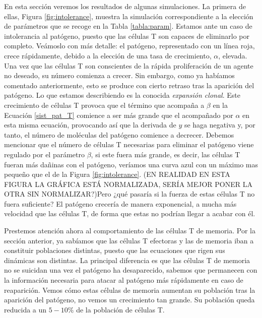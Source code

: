 En esta sección  veremos los resultados de algunas simulaciones. La primera de ellas, Figura \ref{fig:intolerance}, muestra la simulación correspondiente a la elección de parámetros que se recoge en la Tabla \ref{tabla:param}. Estamos ante un caso de intolerancia al patógeno, puesto que las células T son capaces de eliminarlo por completo. 
Veámoslo con más detalle: el patógeno, representado con un línea roja, crece rápidamente, debido a la elección de una tasa de crecimiento, $\alpha$, elevada. Una vez que las células T son conscientes de la rápida proliferación de un agente no deseado, su número comienza a crecer. Sin embargo, como ya habíamos comentado anteriormente, esto se produce con cierto retraso tras la aparición del patógeno. Lo que estamos describiendo es la conocida \textit{expansión clonal}. Este crecimiento de células T provoca que el término que acompaña a $\beta$ en la Ecuación \ref{sist_pat_T} comience a ser más grande que el acompañado por $\alpha$ en esta misma ecuación, provocando así que la derivada de $y$ se haga negativa y, por tanto, el número de moléculas del patógeno comience a decrecer. Debemos mencionar que el número de células T necesarias para eliminar el patógeno viene regulado por el parámetro $\beta$, si este fuera más grande, es decir, las células T fueran más dañinas con el patógeno, veríamos una curva azul con un máximo mas pequeño que el de la Figura \ref{fig:intolerance}. (EN REALIDAD EN ESTA FIGURA LA GRÁFICA ESTÁ NORMALIZADA, SERÍA MEJOR PONER LA OTRA SIN NORMALIZAR?)Pero ¿qué pasaría si la fuerza de estas células T no fuera suficiente? El patógeno crecería de manera exponencial, a mucha más velocidad que las células T, de forma que estas no podrían llegar a acabar con él. 

Prestemos atención ahora al comportamiento de las células T de memoria. Por la sección anterior, ya sabíamos que las células T efectoras y las de memoria iban a constituir poblaciones distintas, puesto que las ecuaciones que rigen sus dinámicas son distintas. La principal diferencia es que las células T de memoria no se suicidan una vez el patógeno ha desaparecido, sabemos que permanecen con la información necesaria para atacar al patógeno más rápidamente en caso de reaparición. Vemos cómo estas células de memoria aumentan su población tras la aparición del patógeno, no vemos un crecimiento tan grande. Su población queda reducida a un $5-10\%$ de la población de células T.


